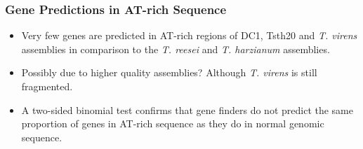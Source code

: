 \documentclass[t]{beamer}
\begin{document}
\begin{frame}
	\frametitle{Gene Predictions in AT-rich Sequence}
	\centering
	\vspace{0.3cm}
	\begin{itemize}
		\item Very few genes are predicted in AT-rich regions of DC1, Tsth20 and \textit{T. virens} assemblies in comparison to the \textit{T. reesei} and \textit{T. harzianum} assemblies.
		\item Possibly due to higher quality assemblies? Although \textit{T. virens} is still fragmented.
		\item A two-sided binomial test confirms that gene finders do not predict the same proportion of genes in AT-rich sequence as they do in normal genomic sequence. 
	\end{itemize}
\end{frame}

\end{document}

